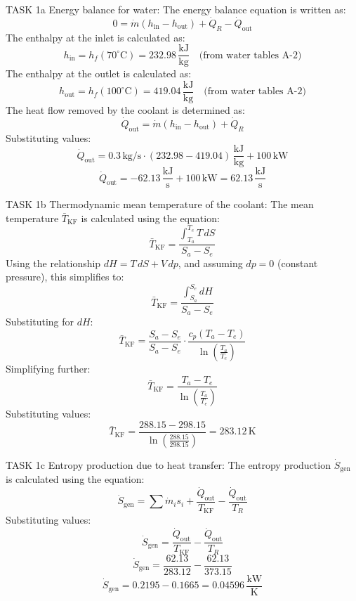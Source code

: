 TASK 1a  
Energy balance for water:  
The energy balance equation is written as:  
\[
0 = \dot{m} (h_{\text{in}} - h_{\text{out}}) + \dot{Q}_R - \dot{Q}_{\text{out}}
\]  
The enthalpy at the inlet is calculated as:  
\[
h_{\text{in}} = h_f(70^\circ\text{C}) = 232.98 \, \frac{\text{kJ}}{\text{kg}} \quad \text{(from water tables A-2)}
\]  
The enthalpy at the outlet is calculated as:  
\[
h_{\text{out}} = h_f(100^\circ\text{C}) = 419.04 \, \frac{\text{kJ}}{\text{kg}} \quad \text{(from water tables A-2)}
\]  
The heat flow removed by the coolant is determined as:  
\[
\dot{Q}_{\text{out}} = \dot{m} (h_{\text{in}} - h_{\text{out}}) + \dot{Q}_R
\]  
Substituting values:  
\[
\dot{Q}_{\text{out}} = 0.3 \, \text{kg/s} \cdot (232.98 - 419.04) \, \frac{\text{kJ}}{\text{kg}} + 100 \, \text{kW}
\]  
\[
\dot{Q}_{\text{out}} = -62.13 \, \frac{\text{kJ}}{\text{s}} + 100 \, \text{kW} = 62.13 \, \frac{\text{kJ}}{\text{s}}
\]  

TASK 1b  
Thermodynamic mean temperature of the coolant:  
The mean temperature \( \bar{T}_{\text{KF}} \) is calculated using the equation:  
\[
\bar{T}_{\text{KF}} = \frac{\int_{T_a}^{T_e} T \, dS}{S_a - S_e}
\]  
Using the relationship \( dH = T \, dS + V \, dp \), and assuming \( dp = 0 \) (constant pressure), this simplifies to:  
\[
\bar{T}_{\text{KF}} = \frac{\int_{S_a}^{S_e} dH}{S_a - S_e}
\]  
Substituting for \( dH \):  
\[
\bar{T}_{\text{KF}} = \frac{S_a - S_e}{S_a - S_e} \cdot \frac{c_p (T_a - T_e)}{\ln \left( \frac{T_a}{T_e} \right)}
\]  
Simplifying further:  
\[
\bar{T}_{\text{KF}} = \frac{T_a - T_e}{\ln \left( \frac{T_a}{T_e} \right)}
\]  
Substituting values:  
\[
\bar{T}_{\text{KF}} = \frac{288.15 - 298.15}{\ln \left( \frac{288.15}{298.15} \right)} = 283.12 \, \text{K}
\]  

TASK 1c  
Entropy production due to heat transfer:  
The entropy production \( \dot{S}_{\text{gen}} \) is calculated using the equation:  
\[
\dot{S}_{\text{gen}} = \sum \dot{m}_i s_i + \frac{\dot{Q}_{\text{out}}}{T_{\text{KF}}} - \frac{\dot{Q}_{\text{out}}}{T_R}
\]  
Substituting values:  
\[
\dot{S}_{\text{gen}} = \frac{\dot{Q}_{\text{out}}}{T_{\text{KF}}} - \frac{\dot{Q}_{\text{out}}}{T_R}
\]  
\[
\dot{S}_{\text{gen}} = \frac{62.13}{283.12} - \frac{62.13}{373.15}
\]  
\[
\dot{S}_{\text{gen}} = 0.2195 - 0.1665 = 0.04596 \, \frac{\text{kW}}{\text{K}}
\]